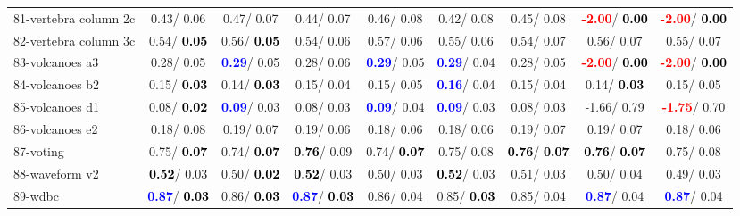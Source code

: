 \begin{table}[h]
\begin{center}
\begin{tabular}{lc|c|c|c|c|c|c|c}
81-vertebra column 2c &   0.43/  0.06 &   0.47/  0.07 &   0.44/  0.07 &   0.46/  0.08 &   0.42/  0.08 &   0.45/  0.08 & \textcolor{red}{\textbf{ -2.00}}/\textcolor{black}{\textbf{  0.00}} & \textcolor{red}{\textbf{ -2.00}}/\textcolor{black}{\textbf{  0.00}} \\
82-vertebra column 3c &   0.54/\textcolor{black}{\textbf{  0.05}} &   0.56/\textcolor{black}{\textbf{  0.05}} &   0.54/  0.06 &   0.57/  0.06 &   0.55/  0.06 &   0.54/  0.07 &   0.56/  0.07 &   0.55/  0.07 \\
83-volcanoes a3 &   0.28/  0.05 & \textcolor{blue}{\textbf{  0.29}}/  0.05 &   0.28/  0.06 & \textcolor{blue}{\textbf{  0.29}}/  0.05 & \textcolor{blue}{\textbf{  0.29}}/  0.04 &   0.28/  0.05 & \textcolor{red}{\textbf{ -2.00}}/\textcolor{black}{\textbf{  0.00}} & \textcolor{red}{\textbf{ -2.00}}/\textcolor{black}{\textbf{  0.00}} \\
84-volcanoes b2 &   0.15/\textcolor{black}{\textbf{  0.03}} &   0.14/\textcolor{black}{\textbf{  0.03}} &   0.15/  0.04 &   0.15/  0.05 & \textcolor{blue}{\textbf{  0.16}}/  0.04 &   0.15/  0.04 &   0.14/\textcolor{black}{\textbf{  0.03}} &   0.15/  0.05 \\
85-volcanoes d1 &   0.08/\textcolor{black}{\textbf{  0.02}} & \textcolor{blue}{\textbf{  0.09}}/  0.03 &   0.08/  0.03 & \textcolor{blue}{\textbf{  0.09}}/  0.04 & \textcolor{blue}{\textbf{  0.09}}/  0.03 &   0.08/  0.03 &  -1.66/  0.79 & \textcolor{red}{\textbf{ -1.75}}/  0.70 \\ \hline
86-volcanoes e2 &   0.18/  0.08 &   0.19/  0.07 &   0.19/  0.06 &   0.18/  0.06 &   0.18/  0.06 &   0.19/  0.07 &   0.19/  0.07 &   0.18/  0.06 \\
87-voting &   0.75/\textcolor{black}{\textbf{  0.07}} &   0.74/\textcolor{black}{\textbf{  0.07}} & \textcolor{black}{\textbf{  0.76}}/  0.09 &   0.74/\textcolor{black}{\textbf{  0.07}} &   0.75/  0.08 & \textcolor{black}{\textbf{  0.76}}/\textcolor{black}{\textbf{  0.07}} & \textcolor{black}{\textbf{  0.76}}/\textcolor{black}{\textbf{  0.07}} &   0.75/  0.08 \\
88-waveform v2 & \textcolor{black}{\textbf{  0.52}}/  0.03 &   0.50/\textcolor{black}{\textbf{  0.02}} & \textcolor{black}{\textbf{  0.52}}/  0.03 &   0.50/  0.03 & \textcolor{black}{\textbf{  0.52}}/  0.03 &   0.51/  0.03 &   0.50/  0.04 &   0.49/  0.03 \\
89-wdbc & \textcolor{blue}{\textbf{  0.87}}/\textcolor{black}{\textbf{  0.03}} &   0.86/\textcolor{black}{\textbf{  0.03}} & \textcolor{blue}{\textbf{  0.87}}/\textcolor{black}{\textbf{  0.03}} &   0.86/  0.04 &   0.85/\textcolor{black}{\textbf{  0.03}} &   0.85/  0.04 & \textcolor{blue}{\textbf{  0.87}}/  0.04 & \textcolor{blue}{\textbf{  0.87}}/  0.04 \\

\end{tabular}
\end{center}
\end{table}
